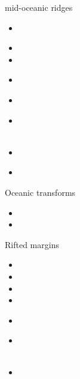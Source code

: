 
mid-oceanic ridges
\begin{small}
\begin{itemize}
\item[\twothousandsixteen] 
\\
\item[\twothousandseventeen] 
\item[\twothousandeighteen] 
\item[\twothousandtwentyone] 
\\ 
\item[\twothousandtwentytwo] 
 \\
\item[\twothousandtwentythree] 
\\
\\
\item[\twothousandtwentyfour] 
 \\
\item[\twothousandtwentyfive]
\end{itemize}
\end{small}

Oceanic transforms
\begin{small}
\begin{itemize}
\item[\twothousandtwentyone] 
\item[\twothousandtwentyfour] 
\end{itemize}
\end{small}


Rifted margins
\begin{small}
\begin{itemize}
\item[\twothousandseventeen] 
\item[\twothousandnineteen] 
\item[\twothousandtwenty] 
\item[\twothousandtwentyone] 
\item[\twothousandtwentytwo] 
 \\
\item[\twothousandtwentythree] 
 \\
 \\ 
\item[\twothousandtwentyfour] 
\end{itemize}
\end{small}


